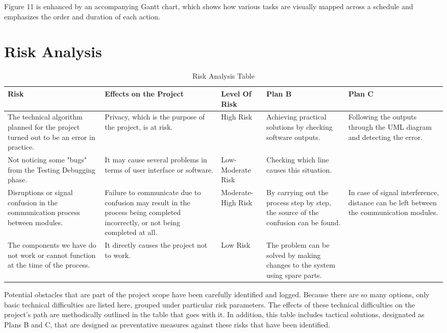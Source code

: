 \documentclass[12pt]{article}
\begin{document}
Figure 11 is enhanced by an accompanying Gantt chart, which shows how various tasks are visually mapped across a schedule and emphasizes the order and duration of each action. 

 	\newpage
 	\section{Risk Analysis}
 
 	\begin{table}[H]
 	\centering
	\renewcommand{\arraystretch}{0.2}
	
 		\begin{tabular}{|p{3cm}|p{3cm}|p{1.6cm}|p{2cm}|p{2cm}|}
 			\hline
 			Risk  & Effects on the Project  & Level Of Risk  & Plan B & Plan C  \\
 			\hline

 	
 			The technical algorithm planned for the project turned out to be an error in practice.  & Privacy, which is the purpose of the project, is at risk.  & High Risk  & Achieving practical solutions by checking software outputs. & Following the outputs through the UML diagram and detecting the error.  \\	\hline
 			Not noticing some "bugs" from the Testing Debugging phase.  & It may cause several problems in terms of user interface or software.  & Low-Moderate Risk  & Checking which line causes this situation. &   \\	\hline
 			Disruptions or signal confusion in the communication process between modules.  & Failure to communicate due to confusion may result in the process being completed incorrectly, or not being completed at all.  & Moderate-High Risk& By carrying out the process step by step, the source of the confusion can be found.  & In case of signal interference, distance can be left between the communication modules.  \\	\hline
 			The components we have do not work or cannot function at the time of the process. & It directly causes the project not to work.  & Low Risk  & The problem can be solved by making changes to the system using spare parts.  &   \\
 			\hline
 		
 		
 		
 	
 		\end{tabular}
 		\caption{Risk Analysis Table}
 	\end{table}
Potential obstacles that are part of the project scope have been carefully identified and logged. Because there are so many options, only basic technical difficulties are listed here, grouped under particular risk parameters. The effects of these technical difficulties on the project's path are methodically outlined in the table that goes with it. In addition, this table includes tactical solutions, designated as Plans B and C, that are designed as preventative measures against these risks that have been identified.
 	\newpage
\end{document}
